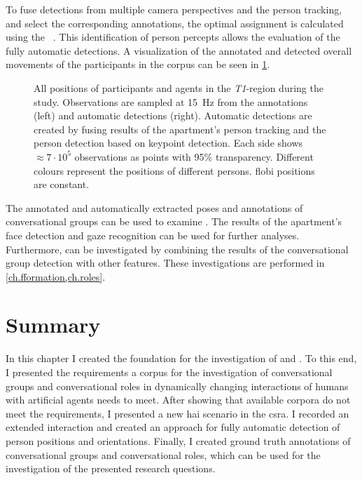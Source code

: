 To fuse detections from multiple camera perspectives and the person tracking, and select the corresponding annotations, the optimal assignment is calculated using the ~.
This identification of person percepts allows the evaluation of the fully automatic detections.
A visualization of the annotated and detected overall movements of the participants in the corpus can be seen in \cref{fig:group-person-movement}.
\begin{figure}[htb!]
    \centering
    \def\svgwidth{1.0\textwidth}
    
    \caption[Movements in annotation and detection.]{\label{fig:group-person-movement}
    All positions of participants and agents in the \emph{T1}-region during the study.
    Observations are sampled at \SI{15}{\Hz} from the annotations (left) and automatic detections (right).
    Automatic detections are created by fusing results of the \gls{apartment}'s person tracking and the person detection based on  keypoint detection.
    Each side shows \(\approx7\cdot10^5\) observations as points with 95\% transparency.
    Different colours represent the positions of different persons.
    \Gls{flobi} positions are constant.
    }
\end{figure}

The annotated and automatically extracted poses and annotations of \glspl{conversational group} can be used to examine .
The results of the \gls{apartment}'s face detection and gaze recognition can be used for further analyses.
Furthermore,  can be investigated by combining the results of the \gls{conversational group} detection with other features.
These investigations are performed in \cref{ch.fformation,ch.roles}.

\section{Summary}\label{sec.group.corpus.summary}

In this chapter I created the foundation for the investigation of  and .
To this end, I presented the requirements a corpus for the investigation of \glspl{conversational group} and \glspl{conversational role} in dynamically changing interactions of humans with \glspl{artificial agent} needs to meet.
After showing that available corpora do not meet the requirements, I presented a new \gls{hai} scenario in the \gls{csra}.
I recorded an extended interaction and created an approach for fully automatic detection of person positions and orientations.
Finally, I created ground truth annotations of \glspl{conversational group} and \glspl{conversational role}, which can be used for the investigation of the presented research questions. 
